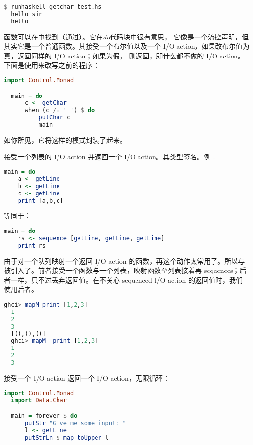 \documentclass[./main.tex]{subfiles}
\begin{document}
\begin{lstlisting}[language=Haskell]
  $ runhaskell getchar_test.hs
  hello sir
  hello
\end{lstlisting}

函数可以在中找到（通过）。它在\textit{do}代码块中很有意思，
它像是一个流控声明，但其实它是一个普通函数。其接受一个布尔值以及一个 I/O action，如果改布尔值为真，返回同样的 I/O action；如果为假，
则返回，即什么都不做的 I/O action。下面是使用来改写之前的程序：

\begin{lstlisting}[language=Haskell]
  import Control.Monad

  main = do
      c <- getChar
      when (c /= ' ') $ do
          putChar c
          main
\end{lstlisting}

如你所见，它将这样的模式封装了起来。

接受一个列表的 I/O action 并返回一个 I/O action。其类型签名。例：

\begin{lstlisting}[language=Haskell]
  main = do
    a <- getLine
    b <- getLine
    c <- getLine
    print [a,b,c]
\end{lstlisting}

等同于：

\begin{lstlisting}[language=Haskell]
  main = do
    rs <- sequence [getLine, getLine, getLine]
    print rs
\end{lstlisting}

由于对一个队列映射一个返回 I/O action 的函数，再这个动作太常用了。所以与
被引入了。前者接受一个函数与一个列表，映射函数至列表接着再 sequences；后者一样，只不过丢弃返回值。在不关心 sequenced I/O action
的返回值时，我们使用后者。

\begin{lstlisting}[language=Haskell]
  ghci> mapM print [1,2,3]
  1
  2
  3
  [(),(),()]
  ghci> mapM_ print [1,2,3]
  1
  2
  3
\end{lstlisting}

接受一个 I/O action 返回一个 I/O action，无限循环：

\begin{lstlisting}[language=Haskell]
  import Control.Monad
  import Data.Char

  main = forever $ do
      putStr "Give me some input: "
      l <- getLine
      putStrLn $ map toUpper l
\end{lstlisting}
\end{document}
